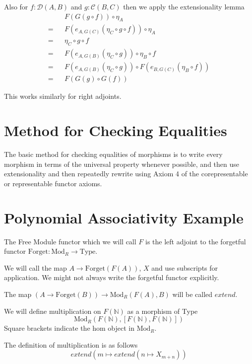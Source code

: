 \documentclass[12pt]{article} %
\theoremstyle{definition}
\theoremstyle{definition}
\theoremstyle{definition}
\theoremstyle{definition}
\begin{document}
Also for $f : \mathcal{D}(A, B)$ and $g : \mathcal{C}(B, C)$
then we apply the extensionality lemma
\begin{equation}
  \begin{aligned}
     && F(G(g \circ f)) \circ \eta_A \\
   = && F(e_{A, G(C)}(\eta_C \circ g \circ f)) \circ \eta_A \\
   = && \eta_C \circ g \circ f \\
   = && F(e_{A, G(B)}(\eta_C \circ g)) \circ \eta_B \circ f \\
   = && F(e_{A, G(B)}(\eta_C \circ g)) \circ F(e_{B, G(C)}(\eta_B \circ f)) \\
   = && F(G(g) \circ G(f))
  \end{aligned}
\end{equation}

This works similarly for right adjoints.

\section{Method for Checking Equalities}

The basic method for checking equalities of morphisms is to write every morphism in terms of 
the universal property whenever possible, and then use extensionality and then repeatedly 
rewrite using Axiom 4 of the corepresentable or representable functor axioms.

\section{Polynomial Associativity Example}

The Free Module functor which we will call $F$ is the left adjoint to the forgetful 
functor $\text{Forget} : \text{Mod}_R \to \text{Type}$.

We will call the map $A \to \text{Forget}(F(A))$, $X$ and use subscripts for application.
We might not always write the forgetful functor explicitly.

The map $(A \to \text{Forget}(B)) \to {\text{Mod}_R}(F(A), B)$ will be called $extend$.

We will define multiplication on $F(\mathbb{N})$ as a morphism of Type 
\begin{equation}
  \text{Mod}_R(F(\mathbb{N}), [F(\mathbb{N}), F(\mathbb{N})])
\end{equation} 
Square brackets indicate the hom object in $\text{Mod}_R$.

The definition of multiplication is as follows
\begin{equation}
  extend (m \mapsto extend (n \mapsto X_{m + n}))
\end{equation}
\end{document}
